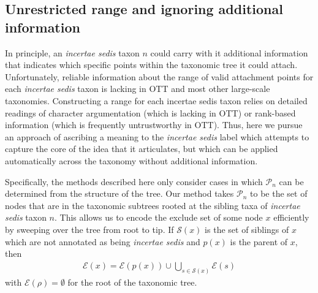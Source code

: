 \documentclass[english]{article}
\begin{document}



\subsection{Unrestricted range and ignoring additional information}
In principle, an \emph{incertae sedis} taxon $n$ could carry with it additional
    information that indicates which specific points within the taxonomic tree
    it could attach.
Unfortunately, reliable information about the range of valid attachment points
for each \emph{incertae sedis} taxon is lacking in OTT and most other large-scale
taxonomies.
Constructing a range for each incertae sedis taxon relies on detailed
readings of character argumentation (which is lacking in OTT) or rank-based
information (which is frequently untrustworthy in OTT). Thus, here we pursue
an approach of ascribing a meaning to the \emph{incertae sedis} label which
attempts to capture the core of the idea that it articulates, but which can be
applied automatically across the taxonomy without additional information.

Specifically, the methods described here only consider cases in which 
    $\mathcal{P}_n$ can be determined from the structure of the tree.
Our method takes $\mathcal{P}_n$ to be the set of nodes that
    are in the taxonomic subtrees rooted at the sibling taxa of \emph{incertae sedis} taxon $n$.
This allows us to encode the exclude set of some node $x$ efficiently by sweeping
    over the tree from root to tip.
If $\mathcal{S}(x)$ is the set of siblings of $x$ which are not annotated as being 
    \emph{incertae sedis} and $p(x)$ is the parent of $x$, then
\begin{align}
    \mathcal{E}(x) = \mathcal{E}(p(x)) \cup \bigcup_{s\in \mathcal{S}(x)} \mathcal{E}(s)
\end{align}
with $\mathcal{E}(\rho) = \emptyset$ for the root of the taxonomic tree.
\end{document}
